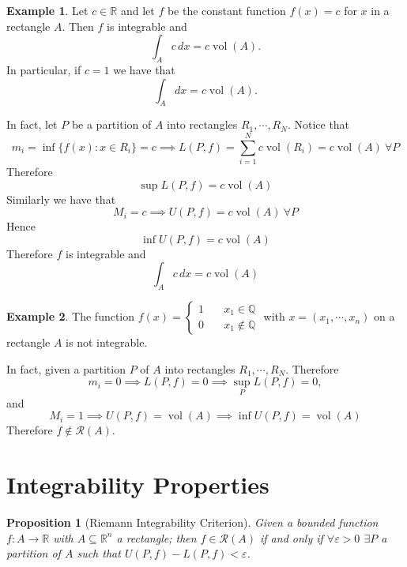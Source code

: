 \documentclass[11pt,openany]{book}
\theoremstyle{plain}
\newtheorem{proposition}{Proposition}[chapter]
\theoremstyle{definition}
\newtheorem{example}{Example}[chapter]
\theoremstyle{remark}
\newcommand{\R}{\mathbb{R}}
\newcommand{\Q}{\mathbb{Q}}
\newcommand{\set}[1]{\{ #1 \}}
\newcommand{\vol}{\operatorname{vol}}
\begin{document}
\begin{example}
    Let $c\in \mathbb R$ and let $f$ be the constant function $f(x)=c$ for $x$ in a rectangle $A$. Then $f$ is integrable and 
    $$\int_A c\, dx = c \vol(A).$$
    In particular, if $c = 1$ we have that 
    $$\int_A dx = c \vol(A).$$

    In fact, let $P$ be a partition of $A$ into rectangles $R_1, \cdots, R_N$. Notice that 
    $$m_i = \inf \set{f(x) \colon x \in R_i}=c \implies L(P,f) = \sum_{i=1}^N c \vol (R_i) = c \vol (A) \ \forall P$$
    Therefore 
    $$\sup L(P, f) = c \vol(A)$$
    Similarly we have that 
    $$M_i = c \implies U(P, f) = c \vol(A) \ \forall P$$
    Hence 
    $$\inf U(P, f) = c \vol(A)$$
    Therefore $f$ is integrable and 
    $$\int_A c\, dx = c \vol (A)$$
\end{example}

\begin{example}
    The function $f(x)= \begin{cases}
        1 \quad& x_1 \in \Q \\
        0 \quad &x_1 \notin \Q
    \end{cases}$ with $x=(x_1,\cdots,x_n)$ on a rectangle $A$ is not integrable. 

    In fact, given a partition $P$ of $A$ into rectangles $R_1, \cdots, R_N$. 
    Therefore 
    $$m_i = 0 \implies L(P, f) = 0 \implies \sup_P L(P, f) = 0,$$
    and 
    $$M_i = 1 \implies U(P,f) = \vol (A) \implies \inf U(P,f) = \vol (A)$$
    Therefore $f \not\in \mathcal{R}(A)$. 
\end{example}

\section{Integrability Properties}
\begin{proposition}[Riemann Integrability Criterion]
    Given a bounded function $f \colon A \to \R$ with $A\subseteq \mathbb R^n$ a rectangle; then $f \in \mathcal{R}(A)$ if and only if 
$\forall \varepsilon > 0$ $\exists P$ a partition of $A$ such that $U(P,f) - L(P, f) < \varepsilon$. 
\end{proposition}
\end{document}
